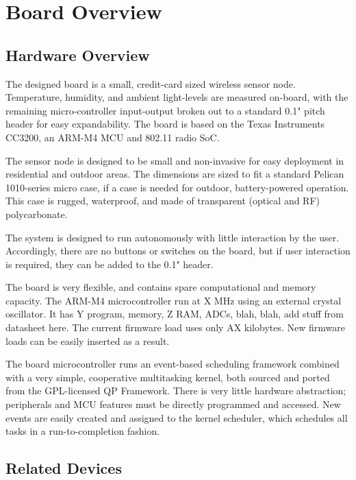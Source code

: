 \chapter{Board Overview}

\section{Hardware Overview}
The designed board is a small, credit-card sized wireless sensor node. Temperature, humidity, and ambient light-levels are measured on-board, with the remaining micro-controller input-output broken out to a standard 0.1" pitch header for easy expandability. The board is based on the Texas Instruments CC3200, an ARM-M4 MCU and 802.11 radio SoC. 


The sensor node is designed to be small and non-invasive for easy deployment in residential and outdoor areas. The dimensions are sized to fit a standard Pelican 1010-series micro case, if a case is needed for outdoor, battery-powered operation. This case is rugged, waterproof, and made of transparent (optical and RF) polycarbonate.

The system is designed to run autonomously with little interaction by the user. Accordingly, there are no buttons or switches on the board, but if user interaction is required, they can be added to the 0.1" header.

The board is very flexible, and contains spare computational and memory capacity. The ARM-M4 microcontroller run at X MHz using an external crystal oscillator. It has Y program, memory, Z RAM, ADCs, blah, blah, add stuff from datasheet here. The current firmware load uses only AX kilobytes. New firmware loads can be easily inserted as a result.


The board microcontroller runs an event-based scheduling framework combined with a very simple, cooperative multitasking kernel, both sourced and ported from the GPL-licensed QP Framework\cite{qp framework}. There is very little hardware abstraction; peripherals and MCU features must be directly programmed and accessed. New events are easily created and assigned to the kernel scheduler, which schedules all tasks in a run-to-completion fashion. 

\section{Related Devices}




